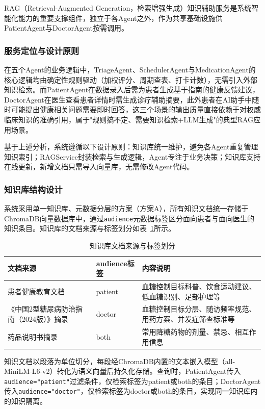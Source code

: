 RAG（Retrieval-Augmented Generation，检索增强生成）知识辅助服务是系统智能化能力的重要支撑组件，独立于各Agent之外，作为共享基础设施供PatientAgent与DoctorAgent按需调用。

\subsubsection{服务定位与设计原则}

在五个Agent的业务逻辑中，TriageAgent、SchedulerAgent与MedicationAgent的核心逻辑均由确定性规则驱动（加权评分、周期查表、打卡计数），无需引入外部知识检索。而PatientAgent在数据录入后需为患者生成基于指南的健康反馈建议，DoctorAgent在医生查看患者详情时需生成诊疗辅助摘要，此外患者在AI助手中随时可能提出健康相关问题需要即时回答，这三个场景的输出质量直接依赖于对权威临床知识的准确引用，属于"规则搞不定、需要知识检索+LLM生成"的典型RAG应用场景。

基于上述分析，系统遵循以下设计原则：知识库统一维护，避免各Agent重复管理知识索引；RAGService封装检索与生成逻辑，Agent专注于业务决策；知识库支持在线更新，新增文档只需导入向量库，无需修改Agent代码。

\subsubsection{知识库结构设计}

系统采用单一知识库、元数据分层的方案（方案A），所有知识文档统一存储于ChromaDB向量数据库中，通过\texttt{audience}元数据标签区分面向患者与面向医生的知识条目。知识库的文档来源与标签划分如表~\ref{tab:kb-structure}所示。

\begin{table}[H]
\centering
\caption{知识库文档来源与标签划分}
\label{tab:kb-structure}
\begin{tabularx}{\textwidth}{|l|l|X|}
\hline
\textbf{文档来源} & \textbf{audience标签} & \textbf{内容说明} \\
\hline
患者健康教育文档 & patient & 血糖控制目标科普、饮食运动建议、低血糖识别、足部护理等 \\
\hline
《中国2型糖尿病防治指南（2024版）》摘录 & doctor & 血糖控制目标分层、随访频率规范、用药方案、并发症筛查标准等 \\
\hline
药品说明书摘录 & both & 常用降糖药物的剂量、禁忌、相互作用信息 \\
\hline
\end{tabularx}
\end{table}

知识文档以段落为单位切分，每段经ChromaDB内置的文本嵌入模型（all-MiniLM-L6-v2）转化为语义向量后持久化存储。查询时，PatientAgent传入\texttt{audience="patient"}过滤条件，仅检索标签为patient或both的条目；DoctorAgent传入\texttt{audience="doctor"}，仅检索标签为doctor或both的条目，实现同一知识库内的知识隔离。

